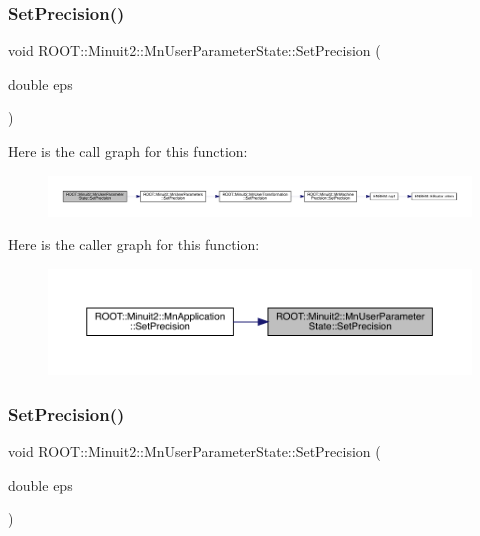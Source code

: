 \subsubsection{\texorpdfstring{SetPrecision()}{SetPrecision()}\hspace{0.1cm}{\footnotesize\ttfamily [2/3]}}
{\footnotesize\ttfamily void R\+O\+O\+T\+::\+Minuit2\+::\+Mn\+User\+Parameter\+State\+::\+Set\+Precision (\begin{DoxyParamCaption}\item[{double}]{eps }\end{DoxyParamCaption})}

Here is the call graph for this function\+:
\nopagebreak
\begin{figure}[H]
\begin{center}
\leavevmode
\includegraphics[width=350pt]{d3/de0/classROOT_1_1Minuit2_1_1MnUserParameterState_aab7787768e533471839387ef51a75cbb_cgraph}
\end{center}
\end{figure}
Here is the caller graph for this function\+:
\nopagebreak
\begin{figure}[H]
\begin{center}
\leavevmode
\includegraphics[width=350pt]{d3/de0/classROOT_1_1Minuit2_1_1MnUserParameterState_aab7787768e533471839387ef51a75cbb_icgraph}
\end{center}
\end{figure}
\mbox{\label{classROOT_1_1Minuit2_1_1MnUserParameterState_aab7787768e533471839387ef51a75cbb}} 
\subsubsection{\texorpdfstring{SetPrecision()}{SetPrecision()}\hspace{0.1cm}{\footnotesize\ttfamily [3/3]}}
{\footnotesize\ttfamily void R\+O\+O\+T\+::\+Minuit2\+::\+Mn\+User\+Parameter\+State\+::\+Set\+Precision (\begin{DoxyParamCaption}\item[{double}]{eps }\end{DoxyParamCaption})}


